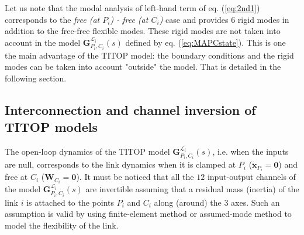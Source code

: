 \documentclass[smallcondensed]{svjour3}     %
\begin{document}
 Let us note that the modal analysis of left-hand term of eq. (\ref{eq:2nd1}) corresponds to the \textit{free (at $P_i$) - free (at $C_i$)} case and provides $6$ rigid modes in addition to the free-free flexible modes. These rigid modes are not taken into account in the model $\mathbf{G}_{P_i,C_i}^{\mathcal{L}_i}(s)$ defined by eq. (\ref{eq:MAPCstate}). This is one the main advantage of the TITOP model: the boundary conditions and the rigid modes can be taken into account "outside" the model. That is detailed in the following section.
 
\subsection{Interconnection and channel inversion of TITOP models} 
The open-loop dynamics of the TITOP model $\mathbf{G}_{P_i,C_i}^{\mathcal{L}_i}(s)$, i.e. when the inputs are null, corresponds to the link dynamics when it is clamped at $P_i$ ($\ddot{\mathbf{x}}_{P_i}=\mathbf{0}$) and free at $C_i$ ($\mathbf{W}_{C_i}=\mathbf{0}$). It must be noticed that all the $12$ input-output channels of the model  $\mathbf{G}_{P_i,C_i}^{\mathcal{L}_i}(s)$  are invertible assuming that a residual mass (inertia) of the link $i$ is attached to the points $P_i$ and $C_i$ along (around) the $3$ axes. Such an assumption is valid by using finite-element method or assumed-mode method to  model the flexibility of the link. 
\end{document}
